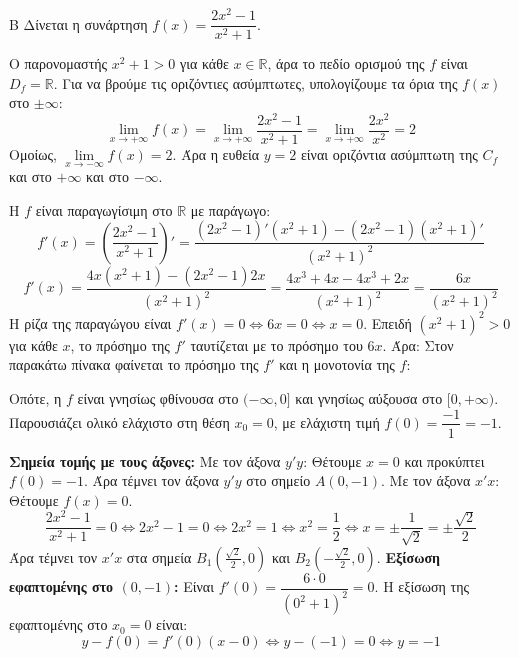 \begin{thema}{Β}
Δίνεται η συνάρτηση $f(x) = \dfrac{2x^2-1}{x^2+1}$.

\begin{erwthma}
\item Ο παρονομαστής $x^2+1 > 0$ για κάθε $x \in \mathbb{R}$, άρα το πεδίο ορισμού της $f$ είναι $D_f = \mathbb{R}$.
Για να βρούμε τις οριζόντιες ασύμπτωτες, υπολογίζουμε τα όρια της $f(x)$ στο $\pm\infty$:
\[ \lim_{x\to+\infty} f(x) = \lim_{x\to+\infty} \dfrac{2x^2-1}{x^2+1} = \lim_{x\to+\infty} \dfrac{2x^2}{x^2} = 2 \]
Ομοίως, $\lim\limits_{x\to-\infty} f(x) = 2$.
Άρα η ευθεία $y = 2$ είναι οριζόντια ασύμπτωτη της $C_f$ και στο $+\infty$ και στο $-\infty$.

\item Η $f$ είναι παραγωγίσιμη στο $\mathbb{R}$ με παράγωγο:
\[ f'(x) = \left( \dfrac{2x^2-1}{x^2+1} \right)' = \dfrac{(2x^2-1)'(x^2+1) - (2x^2-1)(x^2+1)'}{(x^2+1)^2} \]
\[ f'(x) = \dfrac{4x(x^2+1) - (2x^2-1)2x}{(x^2+1)^2} = \dfrac{4x^3+4x-4x^3+2x}{(x^2+1)^2} = \dfrac{6x}{(x^2+1)^2} \]
Η ρίζα της παραγώγου είναι $f'(x) = 0 \Leftrightarrow 6x = 0 \Leftrightarrow x = 0$.
Επειδή $(x^2+1)^2 > 0$ για κάθε $x$, το πρόσημο της $f'$ ταυτίζεται με το πρόσημο του $6x$. Άρα:
Στον παρακάτω πίνακα φαίνεται το πρόσημο της $f'$ και η μονοτονία της $f$:
\begin{center}
\end{center}
Οπότε, η $f$ είναι γνησίως φθίνουσα στο $(-\infty, 0]$ και γνησίως αύξουσα στο $[0, +\infty)$.
Παρουσιάζει ολικό ελάχιστο στη θέση $x_0 = 0$, με ελάχιστη τιμή $f(0) = \dfrac{-1}{1} = -1$.

\item \textbf{Σημεία τομής με τους άξονες:}
Με τον άξονα $y'y$: Θέτουμε $x=0$ και προκύπτει $f(0) = -1$. Άρα τέμνει τον άξονα $y'y$ στο σημείο $A(0, -1)$.
Με τον άξονα $x'x$: Θέτουμε $f(x) = 0$.
\[ \dfrac{2x^2-1}{x^2+1} = 0 \Leftrightarrow 2x^2-1 = 0 \Leftrightarrow 2x^2 = 1 \Leftrightarrow x^2 = \dfrac{1}{2} \Leftrightarrow x = \pm\dfrac{1}{\sqrt{2}} = \pm\dfrac{\sqrt{2}}{2} \]
Άρα τέμνει τον $x'x$ στα σημεία $B_1\left(\frac{\sqrt{2}}{2}, 0\right)$ και $B_2\left(-\frac{\sqrt{2}}{2}, 0\right)$.
\textbf{Εξίσωση εφαπτομένης στο $(0, -1)$:}
Είναι $f'(0) = \dfrac{6\cdot 0}{(0^2+1)^2} = 0$. Η εξίσωση της εφαπτομένης στο $x_0 = 0$ είναι:
\[ y - f(0) = f'(0)(x-0) \Leftrightarrow y - (-1) = 0 \Leftrightarrow y = -1 \]


\end{erwthma}
\end{thema}

